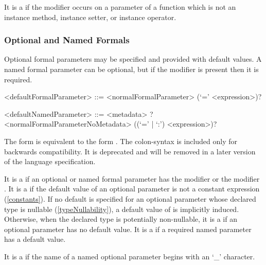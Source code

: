 \documentclass[makeidx]{article}
\begin{document}

\LMHash{}%
It is a  if the modifier \COVARIANT{} occurs on
a parameter of a function which is not
an instance method, instance setter, or instance operator.


\subsubsection{Optional and Named Formals}

\LMHash{}%
Optional formal parameters may be specified and provided with default values.
A named formal parameter can be optional,
but if the modifier \REQUIRED{} is present then it is required.

\begin{grammar}
<defaultFormalParameter> ::= <normalFormalParameter> (`=' <expression>)?

<defaultNamedParameter> ::= \gnewline{}
  <metadata> \REQUIRED? <normalFormalParameterNoMetadata>
  \gnewline{} ((`=' | `:') <expression>)?
\end{grammar}

\LMHash{}%
The form 
is equivalent to the form
.
The colon-syntax is included only for backwards compatibility.
It is deprecated and will be removed in
a later version of the language specification.

\LMHash{}%
It is a  if an optional or named formal parameter has
the modifier \CONST{} or the modifier \LATE.
It is a  if the default value of an optional parameter
is not a constant expression (\ref{constants}).
If no default is specified for an optional parameter
whose declared type is nullable
(\ref{typeNullability}),
a default value of \NULL{} is implicitly induced.
Otherwise, when the declared type is potentially non-nullable, it is a
 if an optional parameter has no default value.
It is a
 if a required named parameter has a default value.

\LMHash{}%
It is a  if the name of a named optional parameter
begins with an `_' character.

\end{document}
